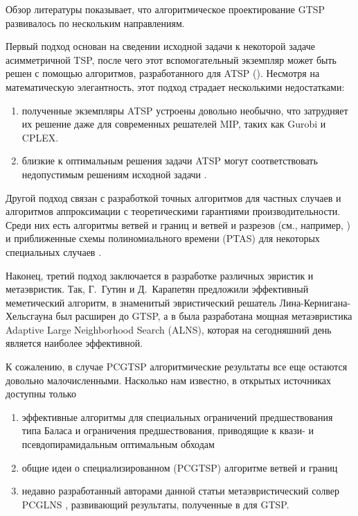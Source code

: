 Обзор литературы показывает,
что алгоритмическое проектирование GTSP развивалось по нескольким направлениям.

Первый подход основан на сведении исходной задачи к некоторой задаче асимметричной TSP,
после чего этот вспомогательный экземпляр может быть решен с помощью алгоритмов,
разработанного для ATSP
(\cite{LaporteSemet1999, NoonBean1993}).
Несмотря на математическую элегантность,
этот подход страдает несколькими недостатками:
\begin{enumerate}
\item
полученные экземпляры ATSP устроены довольно необычно,
что затрудняет их решение даже для современных решателей MIP,
таких как Gurobi и CPLEX.
\item
близкие к оптимальным решения задачи ATSP
могут соответствовать недопустимым решениям исходной задачи
\cite{KaraGut2012}.
\end{enumerate}

Другой подход связан с разработкой точных алгоритмов для частных случаев
и алгоритмов аппроксимации с теоретическими гарантиями производительности.
Среди них есть алгоритмы ветвей и границ и ветвей и разрезов
(см., например, \cite{FishGonToth1997, Yuan2020})
и приближенные схемы полиномиального времени (PTAS)
для некоторых специальных случаев
\cite{FerGriSit2006, KhN-PSIM2017}.

Наконец,
третий подход заключается в разработке
различных эвристик и метаэвристик.
Так, Г.~Гутин и Д.~Карапетян \cite{Gutin-2010}
предложили эффективный меметический алгоритм,
в \cite{Helsgaun-2015} знаменитый эвристический решатель
Лина-Кернигана-Хельсгауна был расширен до GTSP,
а в \cite{SMITH20171} была разработана мощная метаэвристика
Adaptive Large Neighborhood Search (ALNS),
которая на сегодняшний день является наиболее эффективной.

К сожалению, в случае PCGTSP
алгоритмические результаты все еще остаются довольно малочисленными.
Насколько нам известно, в открытых источниках доступны только
\begin{enumerate}
	\item
	эффективные алгоритмы для специальных ограничений предшествования типа Баласа
	\cite {Balas-Sim2001, ChenKhKh2016, CKK-IFAC2016}
	и ограничения предшествования, приводящие к квази- и псевдопирамидальным оптимальным обходам
	\cite{KhN-OPTA2018,KhN-AMAI-2020}
	\item
	общие идеи о специализированном (PCGTSP) алгоритме ветвей и границ
	\cite{SALMAN2020163}
	\item
	недавно разработанный авторами данной статьи метаэвристический солвер PCGLNS
  \cite{KKP-optima2020, PCGLNS},
  развивающий результаты, полученные в
	\cite{SMITH20171}
  для GTSP.
\end{enumerate}

